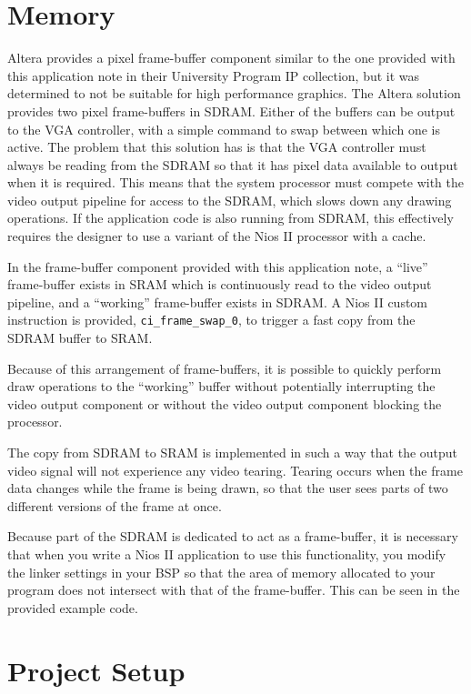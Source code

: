 \documentclass{capstonedoc}
\begin{document}
\section{Memory}

Altera provides a pixel frame-buffer component similar to the one provided with
this application note in their University Program IP collection, but it was
determined to not be suitable for high performance graphics. The
Altera solution provides two pixel frame-buffers in SDRAM. Either of the buffers
can be output to the VGA controller, with a simple command to swap between which
one is active. The problem that this solution has is that the VGA controller
must always be reading from the SDRAM so that it has pixel data available to
output when it is required. This means that the system processor must compete
with the video output pipeline for access to the SDRAM, which slows down any
drawing operations. If the application code is also running from SDRAM, this
effectively requires the designer to use a variant of the Nios II processor
with a cache.

In the frame-buffer component provided with this application note, a ``live''
frame-buffer exists in SRAM which is continuously read to the video output
pipeline, and a ``working'' frame-buffer exists in SDRAM. A Nios II custom
instruction is provided, \texttt{ci\_frame\_swap\_0}, to trigger a fast copy
from the SDRAM buffer to SRAM.

Because of this arrangement of frame-buffers, it is possible to quickly perform
draw operations to the ``working'' buffer without potentially interrupting the
video output component or without the video output component blocking the
processor.

The copy from SDRAM to SRAM is implemented in such a way that the output video
signal will not experience any video tearing. Tearing occurs when the frame data
changes while the frame is being drawn, so that the user sees parts of two
different versions of the frame at once.

Because part of the SDRAM is dedicated to act as a frame-buffer, it is necessary
that when you write a Nios II application to use this functionality, you modify
the linker settings in your BSP so that the area of memory allocated to your
program does not intersect with that of the frame-buffer. This can be seen in
the provided example code.

\section{Project Setup}
\end{document}
